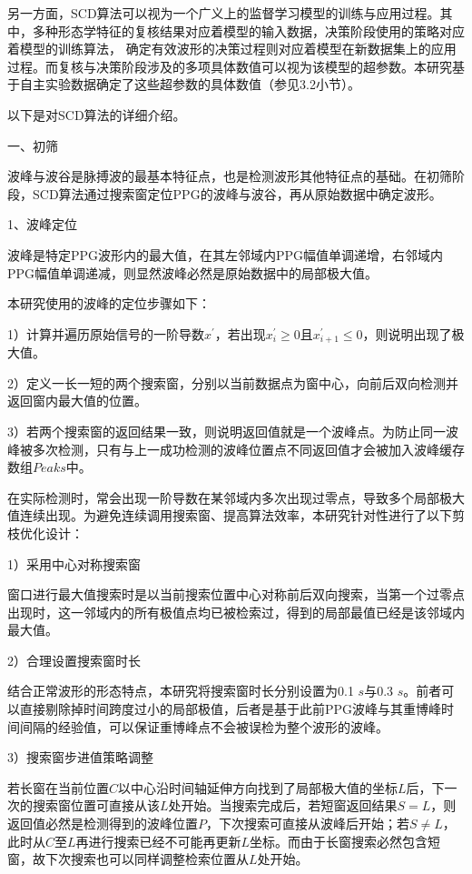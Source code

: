 另一方面，SCD算法可以视为一个广义上的监督学习模型的训练与应用过程\cite{Zhou2016}。其中，多种形态学特征的复核结果对应着模型的输入数据，决策阶段使用的策略对应着模型的训练算法，
确定有效波形的决策过程则对应着模型在新数据集上的应用过程。而复核与决策阶段涉及的多项具体数值可以视为该模型的超参数。本研究基于自主实验数据确定了这些超参数的具体数值（参见3.2小节）。

以下是对SCD算法的详细介绍。

一、初筛

波峰与波谷是脉搏波的最基本特征点，也是检测波形其他特征点的基础。在初筛阶段，SCD算法通过搜索窗定位PPG的波峰与波谷，再从原始数据中确定波形。

1、波峰定位

波峰是特定PPG波形内的最大值，在其左邻域内PPG幅值单调递增，右邻域内PPG幅值单调递减，则显然波峰必然是原始数据中的局部极大值。

本研究使用的波峰的定位步骤如下：

1）计算并遍历原始信号的一阶导数$x^{'}$，若出现$x_i^{'}\ge 0$且$x_{i+1}^{'}\le 0$，则说明出现了极大值。

2）定义一长一短的两个搜索窗，分别以当前数据点为窗中心，向前后双向检测并返回窗内最大值的位置。

3）若两个搜索窗的返回结果一致，则说明返回值就是一个波峰点。为防止同一波峰被多次检测，只有与上一成功检测的波峰位置点不同返回值才会被加入波峰缓存数组$Peaks$中。

在实际检测时，常会出现一阶导数在某邻域内多次出现过零点，导致多个局部极大值连续出现。为避免连续调用搜索窗、提高算法效率，本研究针对性进行了以下剪枝优化设计：

1）采用中心对称搜索窗

窗口进行最大值搜索时是以当前搜索位置中心对称前后双向搜索，当第一个过零点出现时，这一邻域内的所有极值点均已被检索过，得到的局部最值已经是该邻域内最大值。

2）合理设置搜索窗时长

结合正常波形的形态特点，本研究将搜索窗时长分别设置为0.1 $s$与0.3 $s$。前者可以直接剔除掉时间跨度过小的局部极值，后者是基于此前PPG波峰与其重博峰时间间隔的经验值，可以保证重博峰点不会被误检为整个波形的波峰。

3）搜索窗步进值策略调整

若长窗在当前位置$C$以中心沿时间轴延伸方向找到了局部极大值的坐标$L$后，下一次的搜索窗位置可直接从该$L$处开始。当搜索完成后，若短窗返回结果$S=L$，则返回值必然是检测得到的波峰位置$P$，下次搜索可直接从波峰后开始；若$S\ne L$，
此时从$C$至$L$再进行搜索已经不可能再更新$L$坐标。而由于长窗搜索必然包含短窗，故下次搜索也可以同样调整检索位置从$L$处开始。

